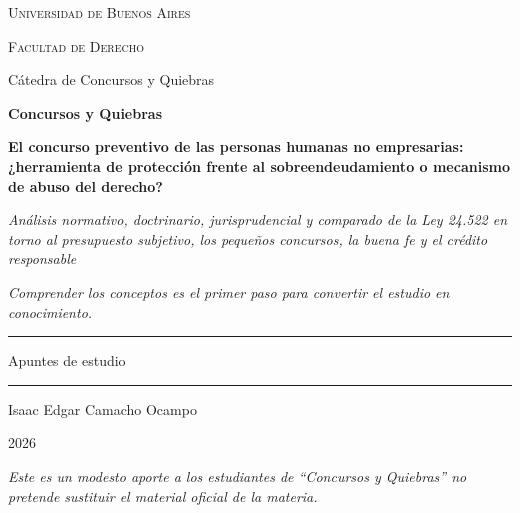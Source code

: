 \documentclass[12pt,oneside]{book}
\newcommand{\universidad}{Universidad de Buenos Aires}
\newcommand{\facultad}{Facultad de Derecho}
\newcommand{\carrera}{Cátedra de Concursos y Quiebras}
\newcommand{\materia}{Concursos y Quiebras}
\newcommand{\titulo}{El concurso preventivo de las personas humanas no empresarias: ¿herramienta de protección frente al sobreendeudamiento o mecanismo de abuso del derecho?}
\newcommand{\subtitulo}{Análisis normativo, doctrinario, jurisprudencial y comparado de la Ley 24.522 en torno al presupuesto subjetivo, los pequeños concursos, la buena fe y el crédito responsable}
\newcommand{\autor}{Isaac Edgar Camacho Ocampo}
\newcommand{\anio}{2026}
\begin{document}
\begin{titlepage}

\thispagestyle{empty}

\begin{center}

\vspace*{1cm}

{\large \textsc{\universidad}}

\vspace{0.2cm}

{\large \textsc{\facultad}}

\vspace{0.2cm}

{\large \carrera}

\vspace{2.2cm}

{\Huge \textbf{\materia}}

\vspace{1cm}

\begin{minipage}{0.9\textwidth}
\centering
{\Large \textbf{\titulo}}

\vspace{0.4cm}

{\normalsize \textit{\subtitulo}}
\end{minipage}

\vspace{0.8cm}

\textit{Comprender los conceptos es el primer paso para convertir el estudio en conocimiento.}

\vspace{1.2cm}

\rule{0.70\textwidth}{0.5pt}

\vspace{0.5cm}

{\large Apuntes de estudio}

\vspace{0.5cm}

\rule{0.70\textwidth}{0.5pt}

\vfill

{\large \autor}

\vspace{0.3cm}

{\large \anio}

\end{center}

\vfill

\begin{flushleft}
\textit{Este es un modesto aporte a los estudiantes de ``\materia'' no pretende sustituir el material oficial de la materia.}
\end{flushleft}

\end{titlepage}
\end{document}
